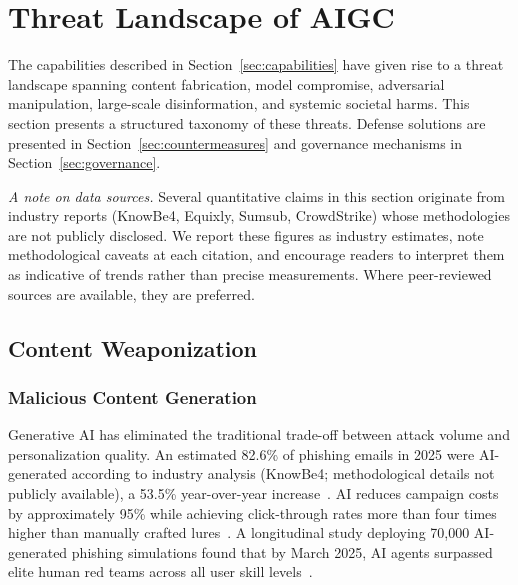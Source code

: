 
\section{Threat Landscape of AIGC}
\label{sec:threats}

The capabilities described in Section~\ref{sec:capabilities} have given rise to a threat landscape spanning content fabrication, model compromise, adversarial manipulation, large-scale disinformation, and systemic societal harms. This section presents a structured taxonomy of these threats. Defense solutions are presented in Section~\ref{sec:countermeasures} and governance mechanisms in Section~\ref{sec:governance}.

\emph{A note on data sources.} Several quantitative claims in this section originate from industry reports (KnowBe4, Equixly, Sumsub, CrowdStrike) whose methodologies are not publicly disclosed. We report these figures as industry estimates, note methodological caveats at each citation, and encourage readers to interpret them as indicative of trends rather than precise measurements. Where peer-reviewed sources are available, they are preferred.


\subsection{Content Weaponization}
\label{sec:threat-weapon}

\subsubsection{Malicious Content Generation}
\label{sec:threat-phishing}

Generative AI has eliminated the traditional trade-off between attack volume and personalization quality. An estimated 82.6\% of phishing emails in 2025 were AI-generated according to industry analysis (KnowBe4; methodological details not publicly available), a 53.5\% year-over-year increase~\cite{knowbe4_2025}. AI reduces campaign costs by approximately 95\% while achieving click-through rates more than four times higher than manually crafted lures~\cite{slashnext2025}. A longitudinal study deploying 70,000 AI-generated phishing simulations found that by March 2025, AI agents surpassed elite human red teams across all user skill levels~\cite{hoxhunt2025}.

